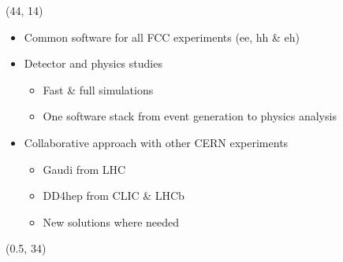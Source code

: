 \documentclass[final,xcolor={dvipsnames,svgnames,x11names,table}]{beamer}
\begin{document}
\begin{frame}
\begin{textblock}{43}
\begin{tcolorbox}[title=The Future Circular Collider Experiment (FCC)]
  \end{tcolorbox}
\end{textblock}

\begin{textblock}{39.5}(44, 14)
  \begin{tcolorbox}[title=FCCSW: Physics and Detector simulations with FCCSW]

  \begin{itemize}
    \item Common software for all FCC experiments (ee, hh \& eh)
    \item Detector and physics studies
      \begin{itemize}
        \item Fast \& full simulations
        \item One software stack from event generation to physics analysis
      \end{itemize}
    \item Collaborative approach with other CERN experiments
      \begin{itemize}
        \item Gaudi from LHC
        \item DD4hep from CLIC \& LHCb
        \item New solutions where needed
      \end{itemize}

  \end{itemize}



  \vspace{1cm}

  \centering
     \vspace{0.5cm}
  \end{tcolorbox}
\end{textblock}

\begin{textblock}{83}(0.5, 34)
  \begin{tcolorbox}[title=The IDEA detector concept for FCC-ee]


\end{tcolorbox}
\end{textblock}
\end{frame}
\end{document}
